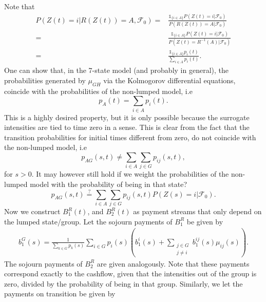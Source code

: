 \documentclass[12pt]{article}
\newcommand{\E}{\text{E}}
\newcommand{\indic}[1]{\mathds{1}_{ \{ #1 \} }}
\renewcommand{\P}{\text{P}}
\theoremstyle{my_thm}
\begin{document}
Note that
\begin{align*}
P(Z(t)=i|R(Z(t))=A,\mathcal{F}_0)=&\frac{\indic{i \in A} P(Z(t)=i|\mathcal{F}_0)}{P(R(Z(t))=A|\mathcal{F}_0)}
\\
=&
\frac{\indic{i \in A} P(Z(t)=i|\mathcal{F}_0)}{P(Z(t)=R^{-1}(A)|\mathcal{F}_0)}
\\
=&
\frac{\indic{i \in A} p_i(t)}{\sum_{i \in A}p_i(t)}.
\end{align*}
One can show that, in the 7-state model (and probably in general), the probabilities generated by $\mu_{GH}$ via the Kolmogorov differential equations, coincide with the probabilities of the non-lumped model, i.e
$$
p_A(t)=\sum_{i \in A} p_i(t).
$$
This is a highly desired property, but it is only possible because the surrogate intensities are tied to time zero in a sense. This is clear from the fact that the transition probabilities for initial times different from zero, do not coincide with the non-lumped model, i.e 
$$
p_{AG}(s,t) \neq \sum_{i \in A}\sum_{j \in G} p_{ij}(s,t),
$$
for $s>0$. It may however still hold if we weight the probabilities of the non-lumped model with the probability of being in that state?
$$
p_{AG}(s,t) \overset{?}{=} \sum_{i \in A}\sum_{j \in G} p_{ij}(s,t)P(Z(s)=i|\mathcal{F}_0).
$$
Now we construct $B_1^R(t)$, and $B_2^R(t)$ as payment streams that only depend on the lumped state/group. Let the sojourn payments of $B_1^R$ be given by
\begin{align*}
b_1^G(s)=\frac{1}{\sum_{k \in G}p_k(s)} \sum_{i \in G} p_i(s) \left( b_1^i(s) + \sum_{ \substack{j \in G \\j \neq i}} b_1^{ij}(s) \mu_{ij}(s) \right).
\end{align*}
The sojourn payments of $B_2^R$ are given analogously. Note that these payments correspond exactly to the cashflow, given that the intensities out of the group is zero, divided by the probability of being in that group. Similarly, we let the payments on transition be given by
\end{document}
